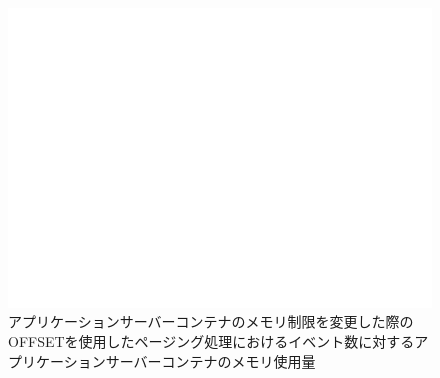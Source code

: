 \documentclass[../../../../../main]{subfiles}
\begin{document}
    \begin{figure}[H]
        \centering
        \includegraphics[width=12cm]{graph}
        \caption{アプリケーションサーバーコンテナのメモリ制限を変更した際のOFFSETを使用したページング処理におけるイベント数に対するアプリケーションサーバーコンテナのメモリ使用量}
        \label{fig:paging-offset-change-app-memory-limit-app-memory-app_4_db_1_1024}
    \end{figure}
\end{document}
